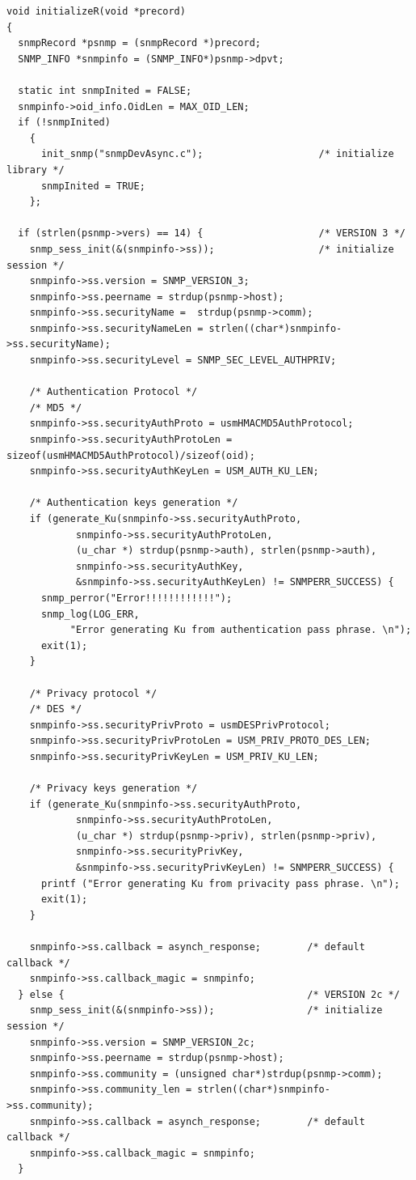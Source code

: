 \documentclass[11pt
  , a4paper
  , article
  , oneside
]{memoir}
\begin{document}
\begin{enumerate}
\begin{lstlisting}[style=termstyle]
void initializeR(void *precord)
{
  snmpRecord *psnmp = (snmpRecord *)precord;
  SNMP_INFO *snmpinfo = (SNMP_INFO*)psnmp->dpvt;

  static int snmpInited = FALSE;
  snmpinfo->oid_info.OidLen = MAX_OID_LEN;
  if (!snmpInited)
    {
      init_snmp("snmpDevAsync.c");                    /* initialize library */
      snmpInited = TRUE;
    };

  if (strlen(psnmp->vers) == 14) {                    /* VERSION 3 */
    snmp_sess_init(&(snmpinfo->ss));                  /* initialize session */    
    snmpinfo->ss.version = SNMP_VERSION_3;
    snmpinfo->ss.peername = strdup(psnmp->host);
    snmpinfo->ss.securityName =  strdup(psnmp->comm);
    snmpinfo->ss.securityNameLen = strlen((char*)snmpinfo->ss.securityName);
    snmpinfo->ss.securityLevel = SNMP_SEC_LEVEL_AUTHPRIV;

    /* Authentication Protocol */
    /* MD5 */
    snmpinfo->ss.securityAuthProto = usmHMACMD5AuthProtocol;
    snmpinfo->ss.securityAuthProtoLen = sizeof(usmHMACMD5AuthProtocol)/sizeof(oid);
    snmpinfo->ss.securityAuthKeyLen = USM_AUTH_KU_LEN;

    /* Authentication keys generation */
    if (generate_Ku(snmpinfo->ss.securityAuthProto,
		    snmpinfo->ss.securityAuthProtoLen,
		    (u_char *) strdup(psnmp->auth), strlen(psnmp->auth),
		    snmpinfo->ss.securityAuthKey,
		    &snmpinfo->ss.securityAuthKeyLen) != SNMPERR_SUCCESS) {
      snmp_perror("Error!!!!!!!!!!!!");
      snmp_log(LOG_ERR,
	       "Error generating Ku from authentication pass phrase. \n");
      exit(1);
    }

    /* Privacy protocol */
    /* DES */
    snmpinfo->ss.securityPrivProto = usmDESPrivProtocol;
    snmpinfo->ss.securityPrivProtoLen = USM_PRIV_PROTO_DES_LEN;
    snmpinfo->ss.securityPrivKeyLen = USM_PRIV_KU_LEN;

    /* Privacy keys generation */
    if (generate_Ku(snmpinfo->ss.securityAuthProto,
		    snmpinfo->ss.securityAuthProtoLen,
		    (u_char *) strdup(psnmp->priv), strlen(psnmp->priv),
		    snmpinfo->ss.securityPrivKey,
		    &snmpinfo->ss.securityPrivKeyLen) != SNMPERR_SUCCESS) {
      printf ("Error generating Ku from privacity pass phrase. \n");
      exit(1);
    }

    snmpinfo->ss.callback = asynch_response;        /* default callback */
    snmpinfo->ss.callback_magic = snmpinfo;
  } else {                                          /* VERSION 2c */
    snmp_sess_init(&(snmpinfo->ss));                /* initialize session */
    snmpinfo->ss.version = SNMP_VERSION_2c;
    snmpinfo->ss.peername = strdup(psnmp->host);
    snmpinfo->ss.community = (unsigned char*)strdup(psnmp->comm);
    snmpinfo->ss.community_len = strlen((char*)snmpinfo->ss.community);
    snmpinfo->ss.callback = asynch_response;        /* default callback */
    snmpinfo->ss.callback_magic = snmpinfo;
  }
  

\end{lstlisting}
\end{enumerate}
\end{document}
